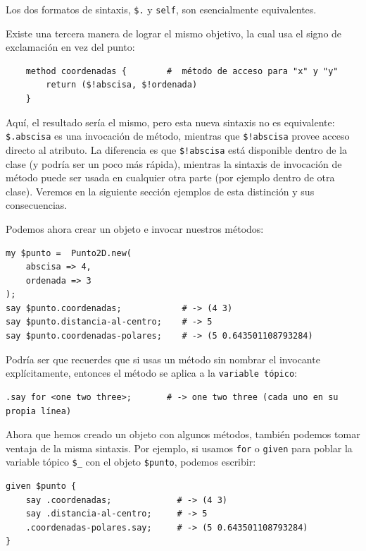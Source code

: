 Los dos formatos de sintaxis, \verb|$.| y {\tt self}, son
esencialmente equivalentes.

Existe una tercera manera de lograr el mismo objetivo,
la cual usa el signo de exclamación en vez del punto:

\begin{verbatim}
    method coordenadas {        #  método de acceso para "x" y "y"
		return ($!abscisa, $!ordenada)
	}
\end{verbatim}

Aquí, el resultado sería el mismo, pero esta nueva sintaxis
no es equivalente: \verb|$.abscisa| es una invocación de método,
mientras que \verb|$!abscisa| provee acceso directo al atributo. 
La diferencia es que \verb|$!abscisa| está disponible dentro de 
la clase (y podría ser un poco más rápida), mientras
la sintaxis de invocación de método puede ser usada en cualquier
otra parte (por ejemplo dentro de otra clase). Veremos en la 
siguiente sección ejemplos de esta distinción y sus consecuencias.

Podemos ahora crear un objeto e invocar nuestros métodos:

\begin{verbatim}
my $punto =  Punto2D.new(
    abscisa => 4, 
    ordenada => 3
);
say $punto.coordenadas;            # -> (4 3)
say $punto.distancia-al-centro;    # -> 5
say $punto.coordenadas-polares;    # -> (5 0.643501108793284)
\end{verbatim}

Podría ser que recuerdes que si usas un método sin nombrar el
invocante explícitamente, entonces el método se aplica
a la \verb|variable tópico|:

\begin{verbatim}
.say for <one two three>;       # -> one two three (cada uno en su propia línea)
\end{verbatim}

Ahora que hemos creado un objeto con algunos métodos, también
podemos tomar ventaja de la misma sintaxis. Por ejemplo, si 
usamos {\tt for} o {\tt given} para poblar la variable tópico
\verb|$_| con el objeto \verb|$punto|, podemos escribir:

\begin{verbatim}
given $punto {
    say .coordenadas;             # -> (4 3)                       
    say .distancia-al-centro;     # -> 5                 
    .coordenadas-polares.say;     # -> (5 0.643501108793284)
}    
\end{verbatim}

